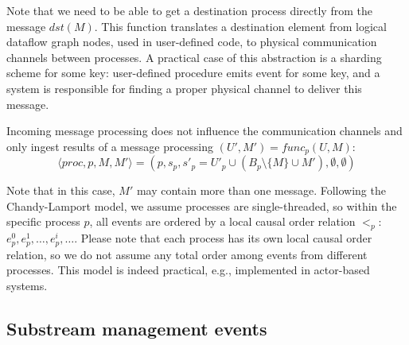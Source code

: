 Note that we need to be able to get a destination process directly from the message $dst(M)$. This function translates a destination element from logical dataflow graph nodes, used in user-defined code, to physical communication channels between processes. A practical case of this abstraction is a sharding scheme for some key: user-defined procedure emits event for some key, and a system is responsible for finding a proper physical channel to deliver this message.

Incoming message processing does not influence the communication channels and only ingest results of a message processing $(U', M') = func_p(U, M)$:
\begin{equation}
    \langle proc, p, M, M' \rangle = (p, s_p, s'_p = U'_p \cup \left(B_p \setminus \{M\} \cup M' \right) , \emptyset, \emptyset)
\end{equation}

Note that in this case, $M'$ may contain more than one message. Following the Chandy-Lamport model, we assume processes are single-threaded, so within the specific process $p$, all events are ordered by a local causal order relation $<_p$: $e^{0}_p,e^{1}_p,\ldots,e^{i}_p,\ldots$. Please note that each process has its own local causal order relation, so we do not assume any total order among events from different processes. This model is indeed practical, e.g., implemented in actor-based systems.


\subsection{Substream management events}
\label{fs-acker-substream-events}

